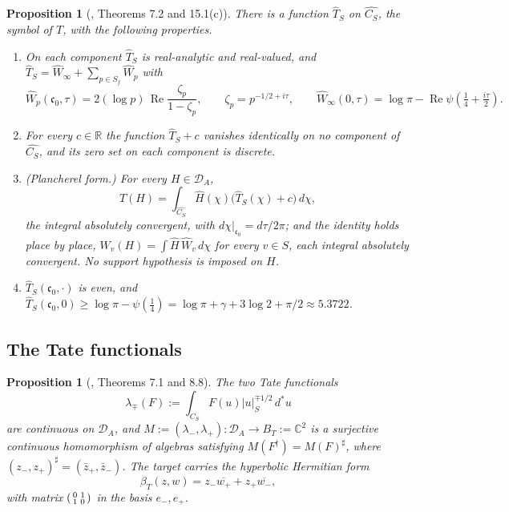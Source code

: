 \documentclass[11pt]{amsart}
\newtheorem{proposition}[theorem]{Proposition}
\theoremstyle{definition}
\theoremstyle{remark}
\newcommand{\C}{\mathbb C}
\newcommand{\R}{\mathbb R}
\newcommand{\Rel}{\operatorname{Re}}
\newcommand{\DA}{\mathcal D_A}
\newcommand{\CS}{C_S}
\newcommand{\cz}{\mathfrak c_0}
\newcommand{\BT}{B_T}
\begin{document}
\begin{proposition}[\cite{P43}, Theorems 7.2 and 15.1(c)]
\label{prop:symbol}
There is a function $\widehat T_S$ on $\widehat{\CS}$, the \emph{symbol} of
$T$, with the following properties.
\begin{enumerate}
\item[(a)] On each component $\widehat T_S$ is real-analytic and real-valued,
and $\widehat T_S=\widehat W_\infty+\sum_{p\in S_f}\widehat W_p$ with
\[
  \widehat W_p(\cz,\tau)=2(\log p)\,\Rel\frac{\zeta_p}{1-\zeta_p},\qquad
  \zeta_p=p^{-1/2+i\tau},\qquad
  \widehat W_\infty(0,\tau)=\log\pi-\Rel\psi(\tfrac14+\tfrac{i\tau}2).
  \tag{2.5}
\]
\item[(b)] For every $c\in\R$ the function $\widehat T_S+c$ vanishes
identically on \emph{no} component of $\widehat{\CS}$, and its zero set on each
component is discrete.
\item[(c)] \emph{(Plancherel form.)}  For every $H\in\DA$,
\[
  T(H)=\int_{\widehat{\CS}}\widehat H(\chi)\bigl(\widehat T_S(\chi)+c\bigr)\,d\chi,
  \tag{2.6}
\]
the integral absolutely convergent, with $d\chi|_{\cz}=d\tau/2\pi$; and the
identity holds place by place, $W_v(H)=\int\widehat H\,\widehat W_v\,d\chi$
for every $v\in S$, each integral absolutely convergent.  No support hypothesis
is imposed on $H$.
\item[(d)] $\widehat T_S(\cz,\cdot)$ is even, and
$\widehat T_S(\cz,0)\ge\log\pi-\psi(\tfrac14)=\log\pi+\gamma+3\log2+\pi/2
\approx5.3722$.
\end{enumerate}
\end{proposition}

\subsection{The Tate functionals}

\begin{proposition}[\cite{P43}, Theorems 7.1 and 8.8]
\label{prop:tate}
The two \emph{Tate functionals}
\[
  \lambda_\mp(F):=\int_{\CS}F(u)|u|_S^{\mp1/2}\,d^*u
  \tag{2.7}
\]
are continuous on $\DA$, and $M:=(\lambda_-,\lambda_+)\colon\DA\to\BT:=\C^2$ is
a surjective continuous homomorphism of algebras satisfying
$M(F^\dagger)=M(F)^\sharp$, where $(z_-,z_+)^\sharp=(\bar z_+,\bar z_-)$.  The
target carries the hyperbolic Hermitian form
\[
  \beta_T(z,w)=z_-\overline{w_+}+z_+\overline{w_-},
  \tag{2.8}
\]
with matrix $\begin{psmallmatrix}0&1\\1&0\end{psmallmatrix}$ in the basis
$e_-,e_+$.
\end{proposition}
\end{document}
